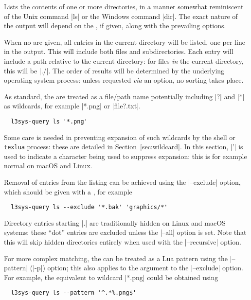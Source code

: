 \documentclass{l3doc}
\begin{document}
\begin{documentation}
Lists the contents of one or more directories, in a manner somewhat reminiscent
of the Unix command |ls| or the Windows command |dir|. The exact nature of the
output will depend on the , if given, along with the prevailing
options.

When no  are given, all entries in the current directory will be
listed, one per line in the output. This will include both files and
subdirectories. Each entry will include a path relative to the current
directory: for files \emph{in} the current directory, this will be |./|. The
order of results will be determined by the underlying operating system process:
unless requested \emph{via} an option, no sorting takes place.

As standard, the  are treated as a file/path name potentially
including |?| and |*| as wildcards, for example |*.png| or |file?.txt|.
\begin{verbatim}
  l3sys-query ls '*.png'
\end{verbatim}
Some care is needed in preventing expansion of such wildcards by the shell or
\texttt{texlua} process: these are detailed in Section~\ref{sec:wildcard}. In
this section, |'| is used to indicate a character being used to suppress
expansion: this is for example normal on macOS and Linux.

Removal of entries from the listing can be achieved using the |--exclude|
option, which should be given with a , for example
\begin{verbatim}
  l3sys-query ls --exclude '*.bak' 'graphics/*'
\end{verbatim}
Directory entries starting |.| are traditionally hidden on Linux and macOS
systems: these \enquote{dot} entries are excluded unless the |--all| option is
set. Note that this will skip hidden directories entirely when used with the
|--recursive| option.

For more complex matching, the  can be treated as a Lua pattern using
the |--pattern| (|-p|) option; this also applies to the  argument to
the |--exclude| option. For example, the equivalent to wildcard |*.png| could be
obtained using
\begin{verbatim}
  l3sys-query ls --pattern '^.*%.png$'
\end{verbatim}


\end{documentation}
\end{document}
